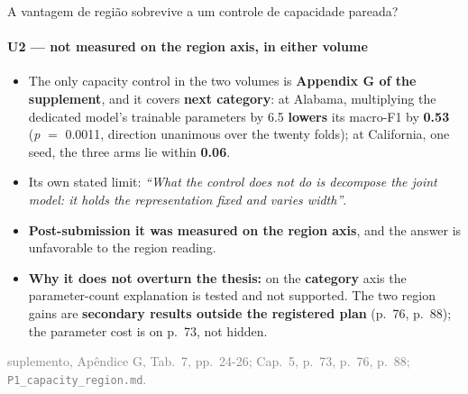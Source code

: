 \documentclass{beamer}
\begin{document}
\begin{frame}[noframenumbering]{A vantagem de região sobrevive a um controle de capacidade pareada?}
    \framesubtitle{U2 --- not measured on the region axis, in either volume}
    \hypertarget{u2}{}
    \small
    \begin{itemize}\setlength{\itemsep}{0pt}\setlength{\parskip}{0pt}
        \item The only capacity control in the two volumes is \textbf{Appendix G of the supplement}, and it covers \textbf{next category}: at Alabama, multiplying the dedicated model's trainable parameters by 6.5 \textbf{lowers} its macro-F1 by \textbf{0.53} (\textit{p} $=$ 0.0011, direction unanimous over the twenty folds); at California, one seed, the three arms lie within \textbf{0.06}.
        \item Its own stated limit: \textit{``What the control does not do is decompose the joint model: it holds the representation fixed and varies width''}.
        \item \textcolor{alert}{\textbf{Post-submission it was measured on the region axis}}, and the answer is unfavorable to the region reading.
        \item \textbf{Why it does not overturn the thesis:} on the \textbf{category} axis the parameter-count explanation is tested and not supported. The two region gains are \textbf{secondary results outside the registered plan} (p.~76, p.~88); the parameter cost is on p.~73, not hidden.
    \end{itemize}
    \vfill
    {\scriptsize
    \begin{minipage}[b]{0.775\linewidth}\raggedright\textcolor{gray}{suplemento, Apêndice G, Tab.~7, pp.~24-26; Cap.~5, p.~73, p.~76, p.~88; \texttt{P1\_capacity\_region.md}.}\end{minipage}\hfill
    \begin{minipage}[b]{0.20\linewidth}\raggedleft \hyperlink{bp1}{}\hyperlink{bapxg}{}\hyperlink{b0}{}\end{minipage}}
\end{frame}
\end{document}
